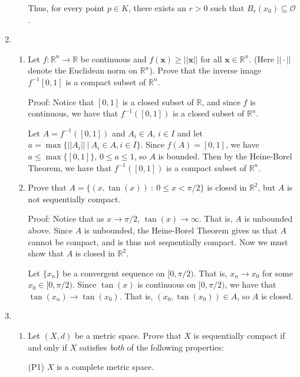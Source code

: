 \documentclass{article}
\begin{document}
\begin{enumerate}
\begin{enumerate}
        Thus, for every point $p \in K$, there exists an $r > 0$ such that $B_r(x_0) \subseteq \mathcal{O}$.
    \end{enumerate}
    
    \item \begin{enumerate}
        \item Let $f: \mathbb{R}^n \to \mathbb{R}$ be continuous and $f(\textbf{x}) \geq ||\textbf{x}||$ for all $\textbf{x} \in \mathbb{R}^n$. (Here $|| \cdot ||$ denote the Euclidean norm on $\mathbb{R}^n$). Prove that the inverse image $f^{-1}[0,1]$ is a compact subset of $\mathbb{R}^n$.
        
        Proof: Notice that $[0,1]$ is a closed subset of $\mathbb{R}$, and since $f$ is continuous, we have that $f^{-1}([0,1])$ is a closed subset of $\mathbb{R}^n$.
        
        Let $A = f^{-1}([0,1])$ and $A_i \in A$, $i \in I$ and let $a = \max{\{||A_i|| \:|\: A_i \in A, i\in I\}}$. Since $f(A) = [0,1]$, we have $a \leq \max{\{[0,1]\}}$, $0 \leq a \leq 1$, so $A$ is bounded. Then by the Heine-Borel Theorem, we have that $f^{-1}([0,1])$ is a compact subset of $\mathbb{R}^n$.
        
        \item Prove that $A = \{(x, \tan{(x)}) \: : \: 0 \leq x < \pi /2\}$ is closed in $\mathbb{R}^2$, but $A$ is not sequentially compact.
        
        Proof: Notice that as $x \to \pi /2$, $\tan{(x)} \to \infty$. That is, $A$ is unbounded above. Since $A$ is unbounded, the Heine-Borel Theorem gives us that $A$ cannot be compact, and is thus not sequentially compact. Now we must show that $A$ is closed in $\mathbb{R}^2$.
        
        Let $\{x_n\}$ be a convergent sequence on $[0, \pi/2)$. That is, $x_n \to x_0$ for some $x_0 \in [0,\pi/2)$. Since $\tan{(x)}$ is continuous on $[0,\pi/2)$, we have that $\tan{(x_n)} \to \tan{(x_0)}$. That is, $(x_0, \tan{(x_0)}) \in A$, so $A$ is closed.
    \end{enumerate}
    
    
    \item \begin{enumerate}
        \item Let $(X,d)$ be a metric space. Prove that $X$ is sequentially compact if and only if $X$ satisfies \textit{both} of the following properties:
        
        (P1) $X$ is a complete metric space.
        

\end{enumerate}
\end{enumerate}
\end{document}
